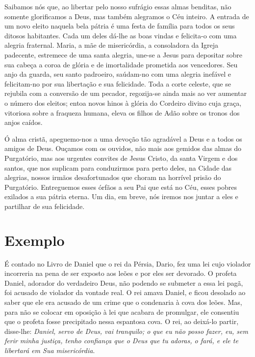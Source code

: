 Saibamos nós que, ao libertar pelo nosso sufrágio essas almas benditas, não somente glorificamos a Deus, mas também alegramos o Céu inteiro. A entrada de um novo eleito naquela bela pátria é uma festa de família para todos os seus ditosos habitantes. Cada um deles dá-lhe as boas vindas e felicita-o com uma alegria fraternal. Maria, a mãe de misericórdia, a consoladora da Igreja padecente, estremece de uma santa alegria, une-se a Jesus para depositar sobre sua cabeça a coroa de glória e de imortalidade prometida aos vencedores. Seu anjo da guarda, seu santo padroeiro, saúdam-no com uma alegria inefável e felicitam-no por sua libertação e sua felicidade. Toda a corte celeste, que se rejubila com a conversão de um pecador, regozija-se ainda mais ao ver aumentar o número dos eleitos; entoa novos hinos à glória do Cordeiro divino cuja graça, vitoriosa sobre a fraqueza humana, eleva os filhos de Adão sobre os tronos dos anjos caídos.

Ó alma cristã, apeguemo-nos a uma devoção tão agradável a Deus e a todos os amigos de Deus. Ouçamos com os ouvidos, não mais aos gemidos das almas do Purgatório, mas aos urgentes convites de Jesus Cristo, da santa Virgem e dos santos, que nos suplicam para conduzirmos para perto deles, na Cidade das alegrias, nossos irmãos desafortunados que choram na horrível prisão do Purgatório. Entreguemos esses órfãos a seu Pai que está no Céu, esses pobres exilados a sua pátria eterna. Um dia, em breve, nós iremos nos juntar a eles e partilhar de sua felicidade.


\section*{Exemplo}

É contado no Livro de Daniel que o rei da Pérsia, Dario, fez uma lei cujo violador incorreria na pena de ser exposto aos leões e por eles ser devorado. O profeta Daniel, adorador do verdadeiro Deus, não podendo se submeter a essa lei pagã, foi acusado de violador da vontade real. O rei amava Daniel, e ficou desolado ao saber que ele era acusado de um crime que o condenaria à cova dos leões. Mas, para não se colocar em oposição à lei que acabara de promulgar, ele consentiu que o profeta fosse precipitado nessa espantosa cova. O rei, ao deixá-lo partir, disse-lhe: \textit{Daniel, servo de Deus, vai tranquilo; o que eu não posso fazer, eu, sem ferir minha justiça, tenho confiança que o Deus que tu adoras, o fará, e ele te libertará em Sua misericórdia}.

